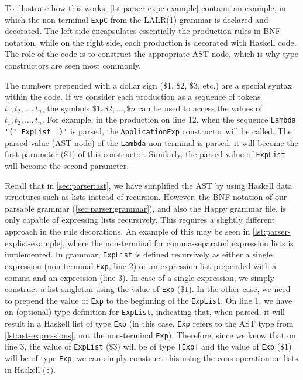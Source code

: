 \par To illustrate how this works, \cref{lst:parser-expc-example} contains an example, in which the non-terminal \lstinline{ExpC} from the LALR(1) grammar is declared and decorated. The left side encapsulates essentially the production rules in BNF notation, while on the right side, each production is decorated with Haskell code. The role of the code is to construct the appropriate AST node, which is why type constructors are seen most commonly. 
\par The numbers prepended with a dollar sign (\$1, \$2, \$3, etc.) are a special syntax within the code. If we consider each production as a sequence of tokens $t_1, t_2, \dots, t_n$, the symbols $\$1, \$2, \dots, \$n$ can be used to access the values of $t_1, t_2, \dots, t_n$. \cite{happyUserGuide} For example, in the production on line 12, when the sequence \lstinline{Lambda '(' ExpList ')'} is parsed, the \lstinline{ApplicationExp} constructor will be called. The parsed value (AST node) of the \lstinline{Lambda} non-terminal is parsed, it will become the first parameter ($\$1$) of this constructor. Similarly, the parsed value of \lstinline{ExpList} will become the second parameter. 
\par Recall that in \cref{sec:parser:ast}, we have simplified the AST by using Haskell data structures such as lists instead of recursion. However, the BNF notation of our parsable grammar (\cref{sec:parser:grammar}), and also the Happy grammar file, is only capable of expressing lists recursively. This requires a slightly different approach in the rule decorations. An example of this may be seen in \cref{lst:parser-explist-example}, where the non-terminal for comma-separated expression lists is implemented. In grammar, \lstinline{ExpList} is defined recursively as either a single expression (non-terminal \lstinline{Exp}, line 2) or an expression list prepended with a comma and an expression (line 3). In case of a single expression, we simply construct a list singleton using the value of \lstinline{Exp} ($\$1$). In the other case, we need to prepend the value of \lstinline{Exp} to the beginning of the \lstinline{ExpList}. On line 1, we have an (optional) type definition for \lstinline{ExpList}, indicating that, when parsed, it will result in a Haskell list of type \lstinline{Exp} (in this case, \lstinline{Exp} refers to the AST type from \cref{lst:ast-expressions}, not the non-terminal \lstinline{Exp}). Therefore, since we know that on line 3, the value of \lstinline{ExpList} ($\$3$) will be of type \lstinline{[Exp]} and the value of \lstinline{Exp} ($\$1$) will be of type \lstinline{Exp}, we can simply construct this using the cons operation on lists in Haskell (\lstinline{:}).


